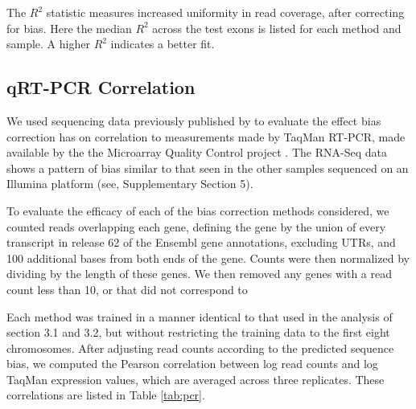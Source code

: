 \documentclass{bioinfo}
\begin{document}
\begin{table}
{
    The $R^2$ statistic measures increased uniformity in read coverage, after
    correcting for bias.  Here the median $R^2$ across the test exons is listed
    for each method and sample. A higher $R^2$ indicates a better fit.
}
\end{table}


\subsection{qRT-PCR Correlation}

We used sequencing data previously published by \citet{Au2010} to evaluate the
effect bias correction has on correlation to measurements made by TaqMan RT-PCR,
made available by the the Microarray Quality Control project \citep{Shi2006}. The
RNA-Seq data shows a pattern of bias similar to that seen in the other samples
sequenced on an Illumina platform (see, Supplementary Section 5).

To evaluate the efficacy of each of the bias correction methods considered, we
counted reads overlapping each gene, defining the gene by the union of every
transcript in release 62 of the Ensembl gene annotations, excluding UTRs, and
100 additional bases from both ends of the gene. Counts were then normalized by
dividing by the length of these genes. We then removed any genes with a read
count less than 10, or that did not correspond to 

Each method was trained in a manner identical to that used in the analysis of
section 3.1 and 3.2, but without restricting the training data to the first
eight chromosomes.  After adjusting read counts according to the predicted
sequence bias, we computed the Pearson correlation between log read counts and
log TaqMan expression values, which are averaged across three replicates. These
correlations are listed in Table \ref{tab:pcr}.
\end{document}
